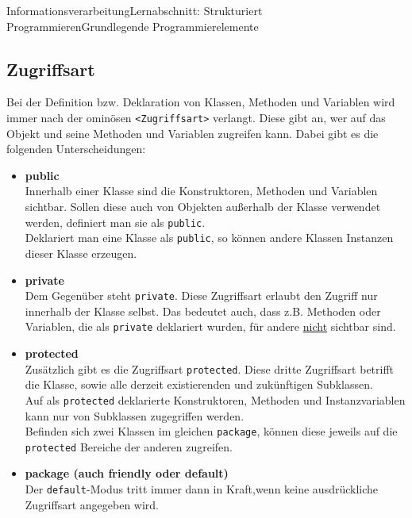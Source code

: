 \documentclass[11pt,oneside,openany,headings=optiontotoc,11pt,numbers=noenddot]{article}
\begin{document}
\begin{worksheet}{Informationsverarbeitung}{Lernabschnitt: Strukturiert Programmieren}{Grundlegende Programmierelemente}
		\subsection{Zugriffsart}
		Bei der Definition bzw. Deklaration von Klassen, Methoden und Variablen wird immer nach der ominösen \lstinline[style=JavaInputStyle]{<Zugriffsart>} verlangt. Diese gibt an, wer auf das Objekt und seine Methoden und Variablen zugreifen kann. Dabei gibt es die folgenden Unterscheidungen:
		\begin{itemize}
			\item \textbf{public}\\
			Innerhalb einer Klasse sind die Konstruktoren, Methoden und Variablen sichtbar. Sollen diese auch von Objekten außerhalb der Klasse verwendet werden, definiert man sie als \lstinline[style=JavaInputStyle]{public}.\\
			Deklariert man eine Klasse als \lstinline[style=JavaInputStyle]{public}, so können andere Klassen Instanzen dieser Klasse erzeugen.
			\item \textbf{private}\\
			Dem Gegenüber steht \lstinline[style=JavaInputStyle]{private}. Diese Zugriffsart erlaubt den Zugriff nur innerhalb der Klasse selbst. Das bedeutet auch, dass z.B. Methoden oder Variablen, die als \lstinline[style=JavaInputStyle]{private} deklariert wurden, für andere \underline{nicht} sichtbar sind.
			\item \textbf{protected}\\
			Zusätzlich gibt es die Zugriffsart \lstinline[style=JavaInputStyle]{protected}. Diese dritte Zugriffsart betrifft die Klasse, sowie alle derzeit existierenden und zukünftigen Subklassen.\\
			Auf als \lstinline[style=JavaInputStyle]{protected} deklarierte Konstruktoren, Methoden und Instanzvariablen kann nur von Subklassen zugegriffen werden.\\
			Befinden sich zwei Klassen im gleichen \lstinline[style=JavaInputStyle]{package}, können diese jeweils auf die \lstinline[style=JavaInputStyle]{protected} Bereiche der anderen zugreifen.
			\item \textbf{package (auch friendly oder default)}\\			
			Der \lstinline[style=JavaInputStyle]{default}-Modus tritt immer dann in Kraft,wenn keine ausdrückliche Zugriffsart angegeben wird.\\
		\end{itemize}
		\begin{tabularx}{\textwidth}{cX}

\end{tabularx}
\end{worksheet}
\end{document}
